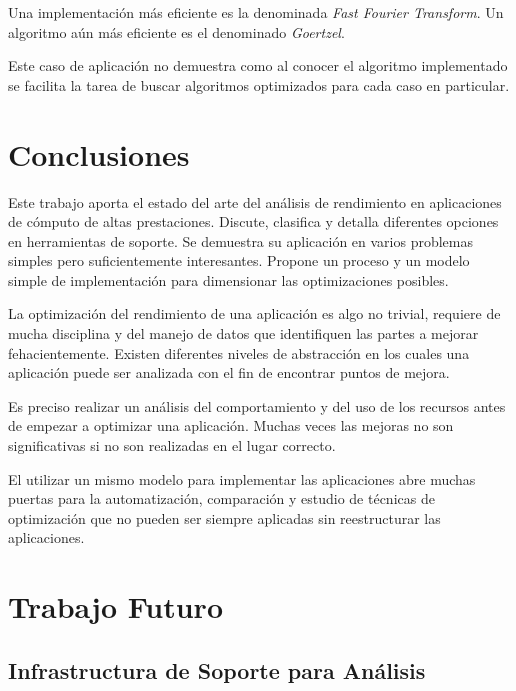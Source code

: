 \documentclass[a4paper]{report}
\begin{document}
Una implementaci\'on m\'as eficiente es la denominada {\it Fast Fourier Transform}.
Un algoritmo a\'un m\'as eficiente es el denominado {\it Goertzel}.

\bigskip

Este caso de aplicaci\'on no demuestra como al conocer el algoritmo implementado se
facilita la tarea de buscar algoritmos optimizados para cada caso en particular.

\chapter{Conclusiones}

Este trabajo aporta el estado del arte del an\'alisis de rendimiento en
aplicaciones de c\'omputo de altas prestaciones. Discute, clasifica y detalla
diferentes opciones en herramientas de soporte. Se demuestra su aplicaci\'on
en varios problemas simples pero suficientemente interesantes. Propone un
proceso y un modelo simple de implementaci\'on para dimensionar las
optimizaciones posibles.

\bigskip

La optimizaci\'on del rendimiento de una aplicaci\'on es algo no trivial, requiere de mucha
disciplina y del manejo de datos que identifiquen las partes a mejorar fehacientemente.
Existen diferentes niveles de abstracci\'on en los cuales una aplicaci\'on puede ser analizada con el fin
de encontrar puntos de mejora. 

\bigskip

Es preciso realizar un an\'alisis del comportamiento y del uso de los recursos antes de
empezar a optimizar una aplicaci\'on. Muchas veces las mejoras no son significativas si no
son realizadas en el lugar correcto.

\bigskip

El utilizar un mismo modelo para implementar las aplicaciones abre muchas puertas para
la automatizaci\'on, comparaci\'on y estudio de t\'ecnicas de optimizaci\'on que no pueden
ser siempre aplicadas sin reestructurar las aplicaciones.

\chapter{Trabajo Futuro}

\section{Infrastructura de Soporte para An\'alisis}
\end{document}
